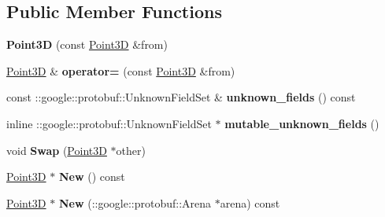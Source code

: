 \subsection*{Public Member Functions}
\begin{DoxyCompactItemize}
\item 
\hypertarget{classstruct_definitions_1_1_point3_d_aea6678596ba92ee36772feae499fe443}{}\label{classstruct_definitions_1_1_point3_d_aea6678596ba92ee36772feae499fe443} 
{\bfseries Point3D} (const \hyperlink{classstruct_definitions_1_1_point3_d}{Point3D} \&from)
\item 
\hypertarget{classstruct_definitions_1_1_point3_d_a4d3ad8fc0eaffcd3fc6dd877a3f6a3af}{}\label{classstruct_definitions_1_1_point3_d_a4d3ad8fc0eaffcd3fc6dd877a3f6a3af} 
\hyperlink{classstruct_definitions_1_1_point3_d}{Point3D} \& {\bfseries operator=} (const \hyperlink{classstruct_definitions_1_1_point3_d}{Point3D} \&from)
\item 
\hypertarget{classstruct_definitions_1_1_point3_d_aa70bd63df814ee71a6077870f28163b3}{}\label{classstruct_definitions_1_1_point3_d_aa70bd63df814ee71a6077870f28163b3} 
const \+::google\+::protobuf\+::\+Unknown\+Field\+Set \& {\bfseries unknown\+\_\+fields} () const
\item 
\hypertarget{classstruct_definitions_1_1_point3_d_a9482f9260f8ee28ccb9dd683958239f3}{}\label{classstruct_definitions_1_1_point3_d_a9482f9260f8ee28ccb9dd683958239f3} 
inline \+::google\+::protobuf\+::\+Unknown\+Field\+Set $\ast$ {\bfseries mutable\+\_\+unknown\+\_\+fields} ()
\item 
\hypertarget{classstruct_definitions_1_1_point3_d_a8f9550f6c6fbcdc01f670e9967920e14}{}\label{classstruct_definitions_1_1_point3_d_a8f9550f6c6fbcdc01f670e9967920e14} 
void {\bfseries Swap} (\hyperlink{classstruct_definitions_1_1_point3_d}{Point3D} $\ast$other)
\item 
\hypertarget{classstruct_definitions_1_1_point3_d_a2253fa95736debaa53882d565f54ff62}{}\label{classstruct_definitions_1_1_point3_d_a2253fa95736debaa53882d565f54ff62} 
\hyperlink{classstruct_definitions_1_1_point3_d}{Point3D} $\ast$ {\bfseries New} () const
\item 
\hypertarget{classstruct_definitions_1_1_point3_d_a2fde4a237ba1d846229cef56c4255b55}{}\label{classstruct_definitions_1_1_point3_d_a2fde4a237ba1d846229cef56c4255b55} 
\hyperlink{classstruct_definitions_1_1_point3_d}{Point3D} $\ast$ {\bfseries New} (\+::google\+::protobuf\+::\+Arena $\ast$arena) const
\item 
\hypertarget{classstruct_definitions_1_1_point3_d_abe5acb81d3df321181731320e2b76ded}{}\label{classstruct_definitions_1_1_point3_d_abe5acb81d3df321181731320e2b76ded} 

\end{DoxyCompactItemize}

